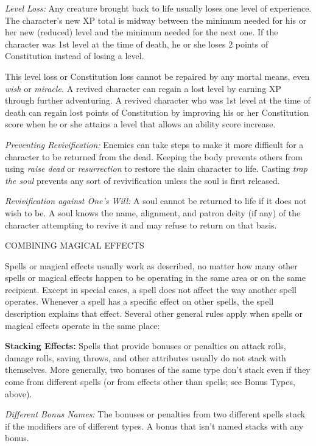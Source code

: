\documentclass{article}
\begin{document}
\textit{Level Loss: }Any creature brought back to life usually loses one level 
of experience. The character's new XP total is midway between the minimum needed 
for his or her new (reduced) level and the minimum needed for the next one. If 
the character was 1st level at the time of death, he or she loses 2 points of Constitution 
instead of losing a level.

This level loss or Constitution loss cannot be repaired by any mortal means, even 
\textit{wish }or \textit{miracle. }A revived character can regain a lost level 
by earning XP through further adventuring. A revived character who was 1st level 
at the time of death can regain lost points of Constitution by improving his or 
her Constitution score when he or she attains a level that allows an ability score 
increase.

\textit{Preventing Revivification: }Enemies can take steps to make it more difficult 
for a character to be returned from the dead. Keeping the body prevents others 
from using \textit{raise dead }or \textit{resurrection }to restore the slain character 
to life. Casting \textit{trap the soul }prevents any sort of revivification unless 
the soul is first released.

\textit{Revivification against One's Will: }A soul cannot be returned to life if 
it does not wish to be. A soul knows the name, alignment, and patron deity (if 
any) of the character attempting to revive it and may refuse to return on that 
basis.

\vspace{12pt}
COMBINING MAGICAL EFFECTS

Spells or magical effects usually work as described, no matter how many other spells 
or magical effects happen to be operating in the same area or on the same recipient. 
Except in special cases, a spell does not affect the way another spell operates. 
Whenever a spell has a specific effect on other spells, the spell description explains 
that effect. Several other general rules apply when spells or magical effects operate 
in the same place:

\textbf{Stacking Effects:} Spells that provide bonuses or penalties on attack rolls, 
damage rolls, saving throws, and other attributes usually do not stack with themselves. 
More generally, two bonuses of the same type don't stack even if they come from 
different spells (or from effects other than spells; see Bonus Types, above). 

\textit{Different Bonus Names: }The bonuses or penalties from two different spells 
stack if the modifiers are of different types. A bonus that isn't named stacks 
with any bonus.
\end{document}
